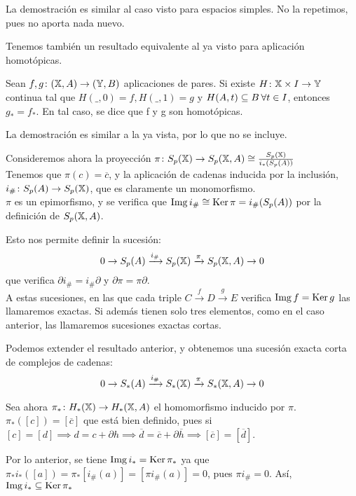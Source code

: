 La demostración es similar al caso visto para espacios simples. No la repetimos, pues no aporta nada nuevo.

Tenemos también un resultado equivalente al ya visto para aplicación homotópicas.

\begin{proposition}
  Sean $f, g \colon ({\mathbb X}, A) \to ({\mathbb Y}, B)$ aplicaciones de pares. Si existe $H \colon {\mathbb X} \times I \to {\mathbb Y}$ continua tal que
  $H(\_, 0) = f, H(\_, 1) = g$ y $H(A, t) \subseteq B \hspace{0.2em} \forall t \in I$, entonces $g_* = f_*$. En tal caso, se dice que
  f y g son homotópicas.
\end{proposition}

La demostración es similar a la ya vista, por lo que no se incluye.

Consideremos ahora la proyección $\pi \colon S_{p}({\mathbb X}) \to S_p({\mathbb X}, A) \cong \frac{S_{p}({\mathbb X})}{i_*(S_p(A))}$ \\
Tenemos que $\pi(c) = \overline{c}$, y la aplicación de cadenas inducida por la inclusión, \\
$i_\# \colon S_p(A) \to S_{p}({\mathbb X})$, que es claramente un monomorfismo. \\
$\pi$ es un epimorfismo, y se verifica que $\operatorname{Img} i_\# \cong \operatorname{Ker} \pi = i_\#(S_p(A))$ por la definición de $S_p({\mathbb X}, A)$.

Esto nos permite definir la sucesión:
\[0 \to S_p(A) \xrightarrow{i_\#} S_{p}({\mathbb X}) \xrightarrow{\pi} S_p({\mathbb X}, A) \to 0 \]
que verifica $\partial i_\# = i_\# \partial$ y $\partial \pi = \pi \partial$. \\
A estas sucesiones, en las que cada triple $C \xrightarrow{f} D \xrightarrow{g} E$ verifica $\operatorname{Img} f = \operatorname{Ker} g$ las llamaremos exactas.
Si además tienen solo tres elementos, como en el caso anterior, las llamaremos sucesiones exactas cortas.

Podemos extender el resultado anterior, y obtenemos una sucesión exacta corta de complejos de cadenas:
\[0 \to S_*(A) \xrightarrow{i_\#} S_*({\mathbb X}) \xrightarrow{\pi} S_*({\mathbb X}, A) \to 0 \]

Sea ahora $\pi_* \colon H_*({\mathbb X}) \to H_*({\mathbb X}, A)$ el homomorfismo inducido por $\pi$. \\
$\pi_*([c]) = [\overline{c}]$ que está bien definido, pues si $[c] = [d] \implies d = c + \partial h \implies \overline{d} = \overline{c} + \partial \overline{h}
\implies [\overline{c}] = [\overline{d}]$.

Por lo anterior, se tiene $\operatorname{Img} i_* = \operatorname{Ker} \pi_*$ ya que $\pi_* i_* ([a]) = \pi_*[i_\#(a)] = [\pi i_\#(a)] = 0$, pues $\pi i_\# = 0$. Así, $\operatorname{Img} i_* \subseteq \operatorname{Ker} \pi_*$

